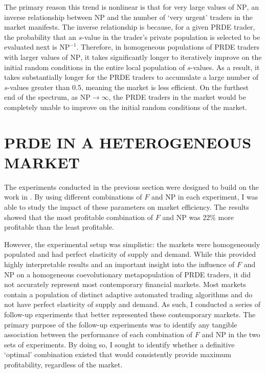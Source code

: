 \documentclass[a4paper,twoside]{article}
\begin{document}
The primary reason this trend is nonlinear is that for very large values of $\mathrm{NP}$, an inverse relationship between $\mathrm{NP}$ and the number of `very urgent' traders in the market manifests.
The inverse relationship is because, for a given PRDE trader, the probability that an $s$-value in the trader's private population is selected to be evaluated next is $\mathrm{NP}^{-1}$.
Therefore, in homogeneous populations of PRDE traders with larger values of $\mathrm{NP}$, it takes significantly longer to iteratively improve on the initial random conditions in the entire local population of $s$-values.
As a result, it takes substantially longer for the PRDE traders to accumulate a large number of $s$-values greater than 0.5, meaning the market is less efficient.
On the furthest end of the spectrum, as $\mathrm{NP}\to\infty$, the PRDE traders in the market would be completely unable to improve on the initial random conditions of the market.

\section{\uppercase{PRDE in a Heterogeneous Market}}

The experiments conducted in the previous section were designed to build on the work in \cite{PRDE}.
By using different combinations of $F$ and $\mathrm{NP}$ in each experiment, I was able to study the impact of these parameters on market efficiency.
The results showed that the most profitable combination of $F$ and $\mathrm{NP}$ was 22\% more profitable than the least profitable.

However, the experimental setup was simplistic: the markets were homogeneously populated and had perfect elasticity of supply and demand.
While this provided highly interpretable results and an important insight into the influence of $F$ and $\mathrm{NP}$ on a homogeneous coevolutionary metapopulation of PRDE traders, it did not accurately represent most contemporary financial markets.
Most markets contain a population of distinct adaptive automated trading algorithms and do not have perfect elasticity of supply and demand.
As such, I conducted a series of follow-up experiments that better represented these contemporary markets. 
The primary purpose of the follow-up experiments was to identify any tangible association between the performance of each combination of $F$ and $\mathrm{NP}$ in the two sets of experiments.
By doing so, I sought to identify whether a definitive `optimal' combination existed that would consistently provide maximum profitability, regardless of the market.
\end{document}
